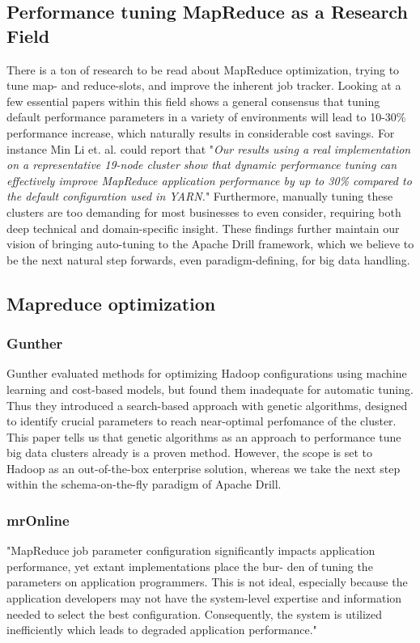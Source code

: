 \documentclass[a4paper,english]{report}
\begin{document}
		\subsection{Performance tuning MapReduce as a Research Field}
		There is a ton of research to be read about MapReduce optimization, trying to tune map- and reduce-slots, and improve the inherent job tracker. Looking at a few essential papers within this field shows a general consensus that tuning default performance parameters in a variety of environments will lead to 10-30\% performance increase, which naturally results in considerable cost savings. For instance Min Li et. al. could report that "\textit{Our results using a real implementation on a representative 19-node cluster show that dynamic performance tuning can effectively improve MapReduce application performance by up to 30\% compared to the default configuration used in YARN.}"\cite{mronline} Furthermore, manually tuning these clusters are too demanding for most businesses to even consider, requiring both deep technical and domain-specific insight. These findings further maintain our vision of bringing auto-tuning to the Apache Drill framework, which we believe to be the next natural step forwards, even paradigm-defining, for big data handling.
	
		\subsection{Mapreduce optimization}
			\subsubsection{Gunther}
			Gunther evaluated methods for optimizing Hadoop configurations using machine learning and cost-based models, but found them inadequate for automatic tuning. Thus they introduced a search-based approach with genetic algorithms, designed to identify crucial parameters to reach near-optimal perfomance of the cluster.\cite{gunther} This paper tells us that genetic algorithms as an approach to performance tune big data clusters already is a proven method. However, the scope is set to Hadoop as an out-of-the-box enterprise solution, whereas we take the next step within the schema-on-the-fly paradigm of Apache Drill.
			
			\subsubsection{mrOnline}
			"MapReduce job parameter configuration significantly impacts
			application performance, yet extant implementations place the bur-
			den of tuning the parameters on application programmers. This is
			not ideal, especially because the application developers may not
			have the system-level expertise and information needed to select
			the best configuration. Consequently, the system is utilized inefficiently which leads to degraded application performance."\cite{mronline}
			
\end{document}
